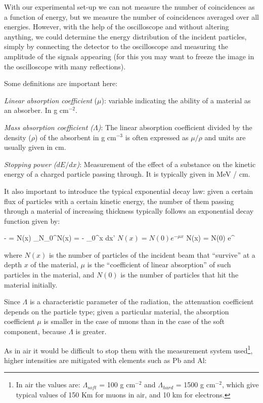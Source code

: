 With our experimental set-up we can not measure the number of coincidences as a function of energy, but we measure the number of coincidences averaged over all energies. However, with the help of the oscilloscope and without altering anything, we could determine the energy distribution of the incident particles, simply by connecting the detector to the oscilloscope and measuring the amplitude of the signals appearing (for this you may want to freeze the image in the oscilloscope with many reflections).

Some definitions are important here:

\bi
	\item \textit{Linear absorption coefficient} ($\mu$): variable indicating the ability of a material as an absorber. In g cm$^{-2}$.
	\item \textit{Mass absorption coefficient ($\Lambda$)}: The linear absorption coefficient divided by the density ($\rho$) of the absorbent in g cm$^{-3}$ is often expressed as $\mu / \rho$ and units are usually given in cm.
	\item \textit{Stopping power ($dE / dx$)}: Measurement of the effect of a substance on the kinetic energy of a charged particle passing through. It is typically given in MeV / cm.
\ei


It also important to introduce the typical exponential decay law: given a certain flux of particles with a certain kinetic energy, the number of them passing through a material of increasing thickness typically follows an exponential decay function given by:

		
		\be- = \mu N(x) \quad \rightarrow \quad \int_{N_0}^{N(x)} = - \mu\int_0^x dx' \ee
		\bc $N(x) = N(0) e^{-\mu x}$ \ec
		\be N(x) = N(0) e^{}\ee

where $N(x)$ is the number of particles of the incident beam that \enquote{survive} at a depth $x$ of the material, $\mu$ is the \enquote{coefficient of linear absorption} of such particles in the material, and $N (0)$ is the number of particles that hit the material initially.

Since $\Lambda$ is a characteristic parameter of the radiation, the attenuation coefficient depends on the particle type; given a particular material, the absorption coefficient $\mu$ is smaller in the case of muons than in the case of the soft component, because $\Lambda$ is greater.

As in air it would be difficult to stop them with the measurement system used\footnote{In air the values ​​are: $\Lambda_{soft}$ = 100 g cm$^{-2}$ and $\Lambda_{hard}$ = 1500 g cm$^{-2}$, which give typical values ​​of 150 Km for muons in air, and 10 km for electrons.}, higher intensities are mitigated with elements such as Pb and Al:

